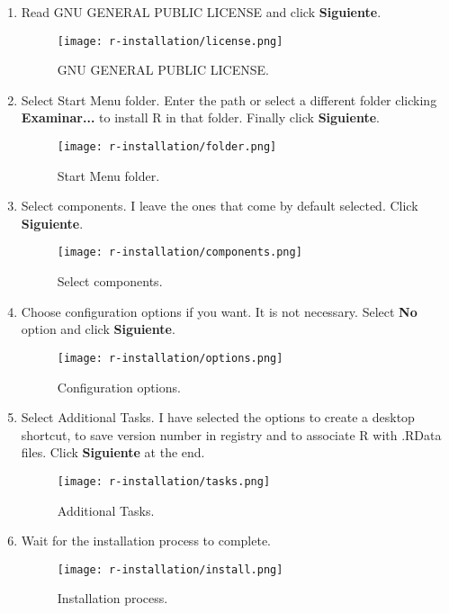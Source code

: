 \begin{enumerate}
    \item Read GNU GENERAL PUBLIC LICENSE and click \textbf{Siguiente}.
        \begin{figure}[H]
            \centering
            \texttt{[image: r-installation/license.png]}
            \caption{GNU GENERAL PUBLIC LICENSE.}
            \label{fig:license}
        \end{figure}
    
    \item Select Start Menu folder. Enter the path or select a different folder clicking \textbf{Examinar...} to install R in that folder. Finally click \textbf{Siguiente}.
        \begin{figure}[H]
            \centering
            \texttt{[image: r-installation/folder.png]}
            \caption{Start Menu folder.}
            \label{fig:folder}
        \end{figure}
    
    \item Select components. I leave the ones that come by default selected. Click \textbf{Siguiente}.
        \begin{figure}[H]
            \centering
            \texttt{[image: r-installation/components.png]}
            \caption{Select components.}
            \label{fig:components}
        \end{figure}
    
    \item Choose configuration options if you want. It is not necessary. Select \textbf{No} option and click \textbf{Siguiente}.
        \begin{figure}[H]
            \centering
            \texttt{[image: r-installation/options.png]}
            \caption{Configuration options.}
            \label{fig:options}
        \end{figure}
    
    \item Select Additional Tasks. I have selected the options to create a desktop shortcut, to save version number in registry and to associate R with .RData files. Click \textbf{Siguiente} at the end.
        \begin{figure}[H]
            \centering
            \texttt{[image: r-installation/tasks.png]}
            \caption{Additional Tasks.}
            \label{fig:tasks}
        \end{figure}
    
    \item Wait for the installation process to complete.
        \begin{figure}[H]
            \centering
            \texttt{[image: r-installation/install.png]}
            \caption{Installation process.}
            \label{fig:install}
        \end{figure}
    

\end{enumerate}
